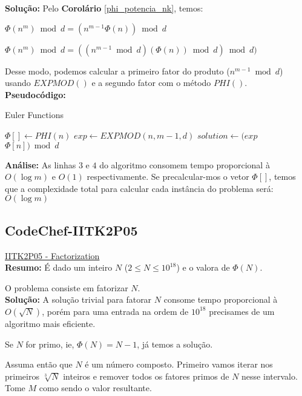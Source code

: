 \textbf{Solução:}
Pelo \textbf{Corolário} \autoref{phi_potencia_nk}, temos: 

$\Phi(n^m) \bmod d = (n^{m-1}\Phi(n)) \bmod d$

$\Phi(n^m) \bmod d = ((n^{m-1} \bmod d)(\Phi(n)) \bmod d) \bmod d)$

Desse modo, podemos calcular a primeiro fator do produto ($n^{m-1} \bmod d$) usando $EXPMOD()$ e a segundo fator com o método $PHI()$.
\\

\textbf{Pseudocódigo:}
\begin{algorithm}
\caption{Euler Functions}
\begin{algorithmic}[1]
\State $\Phi[] \gets PHI(n)$
\State $exp \gets EXPMOD(n, m-1, d)$
\State $solution \gets (exp$ $\Phi[n]) \bmod d$
\State {}
\EndProcedure
\end{algorithmic}
\end{algorithm}

\textbf{Análise:}
As linhas $3$ e $4$ do algoritmo consomem tempo proporcional à $O(\log m)$ e $O(1)$ respectivamente.
Se precalcular-mos o vetor $\Phi[]$, temos que a complexidade total para calcular cada instância do problema será: $O(\log m)$ 



\subsection{CodeChef-IITK2P05}
\href{https://www.codechef.com/problems/IITK2P05}{IITK2P05 - Factorization}\\

\textbf{Resumo:}
É dado um inteiro $N$ ($2 \leq N \leq 10^{18}$) e o valora de $\Phi(N)$.

O problema consiste em fatorizar $N$. 
\\

\textbf{Solução:}
A solução trivial para fatorar $N$ consome tempo proporcional à $O(\sqrt{N})$, porém para uma entrada na ordem de $10^{18}$ precisames de um algoritmo mais eficiente.

Se $N$ for primo, ie, $\Phi(N) = N-1$, já temos a solução.

Assuma então que $N$ é um número composto. Primeiro vamos iterar nos primeiros $\sqrt[3]{N}$ inteiros e remover todos os fatores primos de $N$ nesse intervalo. Tome $M$ como sendo o valor resultante.

